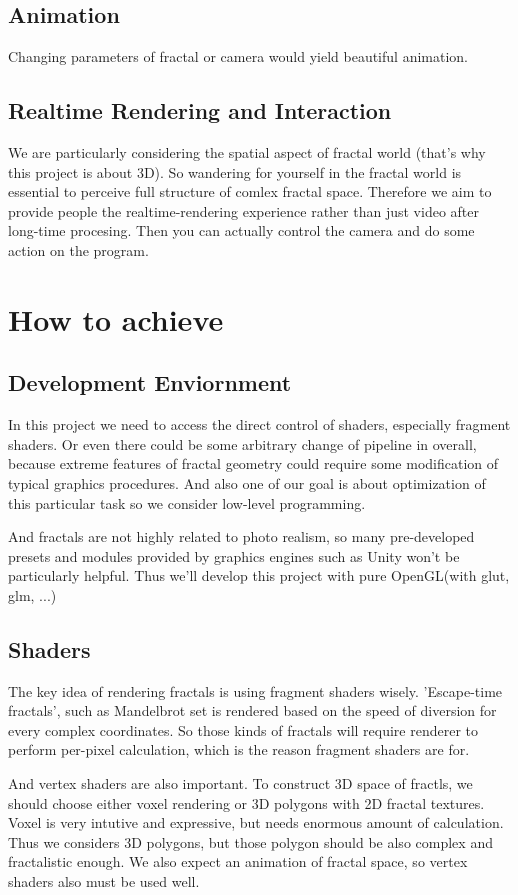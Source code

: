 \documentclass[a4paper]{article}
\begin{document}
\subsection{Animation}
Changing parameters of fractal or camera would yield beautiful animation.
\subsection{Realtime Rendering and Interaction}
We are particularly considering the spatial aspect of fractal world (that's why this project is about 3D).
So wandering for yourself in the fractal world is essential to perceive full structure of comlex fractal space.
Therefore we aim to provide people the realtime-rendering experience rather than just video after long-time procesing.
Then you can actually control the camera and do some action on the program.
\section{How to achieve}
\subsection{Development Enviornment}
In this project we need to access the direct control of shaders, especially fragment shaders.
Or even there could be some arbitrary change of pipeline in overall, because extreme features of fractal geometry could require some modification of typical graphics procedures.
And also one of our goal is about optimization of this particular task so we consider low-level programming.

And fractals are not highly related to photo realism, so many pre-developed presets and modules provided by
graphics engines such as Unity won't be particularly helpful.
Thus we'll develop this project with pure OpenGL(with glut, glm, ...)
\subsection{Shaders}
The key idea of rendering fractals is using fragment shaders wisely.
'Escape-time fractals', such as Mandelbrot set is rendered based on the speed of diversion for every complex coordinates.
So those kinds of fractals will require renderer to perform per-pixel calculation, which is the reason fragment shaders are for.

And vertex shaders are also important.
To construct 3D space of fractls, we should choose either voxel rendering or 3D polygons with 2D fractal textures.
Voxel is very intutive and expressive, but needs enormous amount of calculation.
Thus we considers 3D polygons, but those polygon should be also complex and fractalistic enough.
We also expect an animation of fractal space, so vertex shaders also must be used well.
\end{document}
